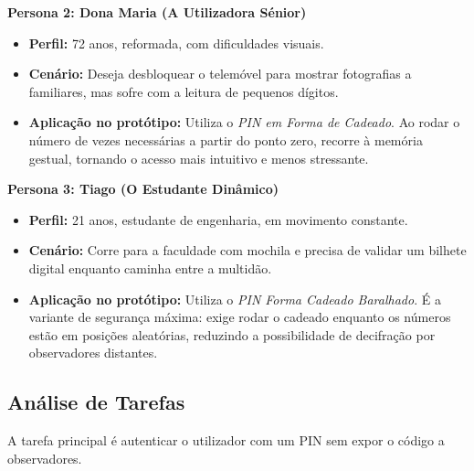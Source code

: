 \documentclass[a4paper]{article}
\begin{document}
\textbf{Persona 2: Dona Maria (A Utilizadora Sénior)}
\begin{itemize}
    \item \textbf{Perfil:} 72 anos, reformada, com dificuldades visuais.
    \item \textbf{Cenário:} Deseja desbloquear o telemóvel para mostrar fotografias a familiares, mas sofre com a leitura de pequenos dígitos.
    \item \textbf{Aplicação no protótipo:} Utiliza o \textit{PIN em Forma de Cadeado}. Ao rodar o número de vezes necessárias a 
    partir do ponto zero, recorre à memória gestual, tornando o acesso mais intuitivo e menos stressante.
\end{itemize}

\textbf{Persona 3: Tiago (O Estudante Dinâmico)}
\begin{itemize}
    \item \textbf{Perfil:} 21 anos, estudante de engenharia, em movimento constante.
    \item \textbf{Cenário:} Corre para a faculdade com mochila e precisa de validar um bilhete digital enquanto caminha entre a multidão.
    \item \textbf{Aplicação no protótipo:} Utiliza o \textit{PIN Forma Cadeado Baralhado}. É a variante de segurança máxima: exige rodar 
    o cadeado enquanto os números estão em posições aleatórias, reduzindo a possibilidade de decifração por observadores distantes.
\end{itemize}

\newpage
\subsection{Análise de Tarefas}
A tarefa principal é autenticar o utilizador com um PIN sem expor o código a observadores.
\end{document}
